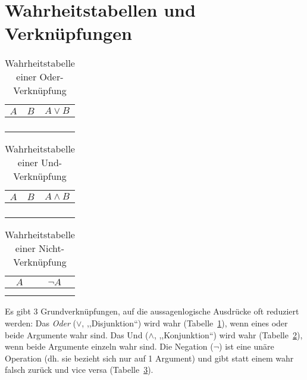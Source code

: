 \section{Wahrheitstabellen und Verknüpfungen}
%
\begin{table}[p]
 \begin{center}
  \begin{tabular}{cc|c}
   \hline
    $A$ & $B$ & $A \lor B$ \\
   \hline \hline
    \F  & \F  & \F \\
    \F  & \T  & \T \\
    \T  & \F  & \T \\
    \T  & \T  & \T \\
  \end{tabular}
  \caption{Wahrheitstabelle einer Oder-Verknüpfung}
  \label{fig:or_operator}
 \end{center}
\end{table}
\begin{table}[p]
 \begin{center}
  \begin{tabular}{cc|c}
   \hline
    $A$ & $B$ & $A \land B$ \\
   \hline \hline
    \F  & \F  & \F \\
    \F  & \T  & \F \\
    \T  & \F  & \F \\
    \T  & \T  & \T \\
  \end{tabular}
  \caption{Wahrheitstabelle einer Und-Verknüpfung}
  \label{fig:and_operator}
 \end{center}
\end{table}
\begin{table}[p]
 \begin{center}
  \begin{tabular}{c|c}
   \hline
    $A$ & $\neg A$ \\
   \hline \hline
    \F   & \T \\
    \T   & \F \\
  \end{tabular}
  \caption{Wahrheitstabelle einer Nicht-Verknüpfung}
  \label{fig:neg_operator}
 \end{center}
\end{table}
%
Es gibt 3 Grundverknüpfungen, auf die aussagenlogische Ausdrücke oft reduziert werden: Das \emph{Oder} ($\lor$, ,,Disjunktion``) wird wahr (Tabelle~\ref{fig:or_operator}), wenn eines oder beide Argumente wahr sind. Das Und ($\land$, ,,Konjunktion``) wird wahr (Tabelle~\ref{fig:and_operator}), wenn beide Argumente einzeln wahr sind. Die Negation ($\neg$) ist eine unäre Operation (dh. sie bezieht sich nur auf 1 Argument) und gibt statt einem wahr falsch zurück und vice versa (Tabelle~\ref{fig:neg_operator}).

